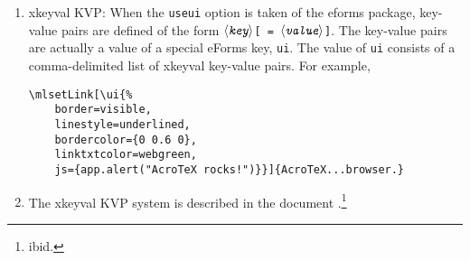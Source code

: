 \documentclass{article}
\makeatletter
\edef\amtIndent{\the\leftmargini}
\def\anglemeta#1{$\langle\textit{\texttt{#1}}\rangle$}
\let\pkg\textsf
\let\opt\texttt
\def\cs#1{\texttt{\@backslashchar#1}}
\makeatother
\begin{document}
\begin{enumerate}
    \item \pkg{xkeyval} KVP: When the \opt{useui} option is taken of the eforms package, key-value pairs are
        defined of the form \texttt{\anglemeta{key}[\,=\,\anglemeta{value}]}. The key-value pairs are actually a value of
        a special eForms key, \cs{ui}. The value of \cs{ui} consists of a comma-delimited list of
        \pkg{xkeyval} key-value pairs. For example,
\begin{Verbatim}[xleftmargin=\amtIndent,fontsize=\small]
\mlsetLink[\ui{%
    border=visible,
    linestyle=underlined,
    bordercolor={0 0.6 0},
    linktxtcolor=webgreen,
    js={app.alert("AcroTeX rocks!")}}]{AcroTeX...browser.}
\end{Verbatim}
    \item[] The \pkg{xkeyval} KVP system is described in the document
    \textsl{}.\footnote
    {ibid.}
\end{enumerate}
\end{document}
